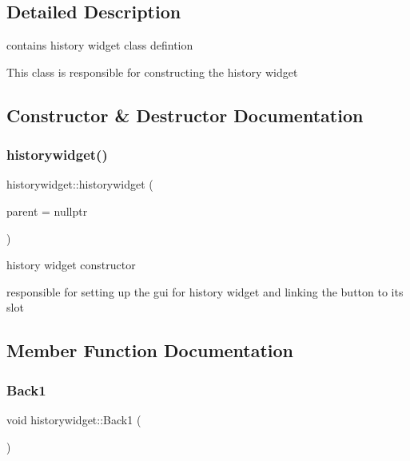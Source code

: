 \subsection{Detailed Description}
contains history widget class defintion 

This class is responsible for constructing the history widget 

\subsection{Constructor \& Destructor Documentation}
\mbox{\label{classhistorywidget_ac21cb2c9cdecd91ac572d8fc8ba50708}} 
\subsubsection{\texorpdfstring{historywidget()}{historywidget()}}
{\footnotesize\ttfamily historywidget\+::historywidget (\begin{DoxyParamCaption}\item[{Q\+Widget $\ast$}]{parent = {\ttfamily nullptr} }\end{DoxyParamCaption})\hspace{0.3cm}{\ttfamily [explicit]}}



history widget constructor 

responsible for setting up the gui for history widget and linking the button to its slot 

\subsection{Member Function Documentation}
\mbox{\label{classhistorywidget_a19aa3f9d16ac28a32b31b340623b0611}} 
\subsubsection{\texorpdfstring{Back1}{Back1}}
{\footnotesize\ttfamily void historywidget\+::\+Back1 (\begin{DoxyParamCaption}{ }\end{DoxyParamCaption})\hspace{0.3cm}{\ttfamily [slot]}}



